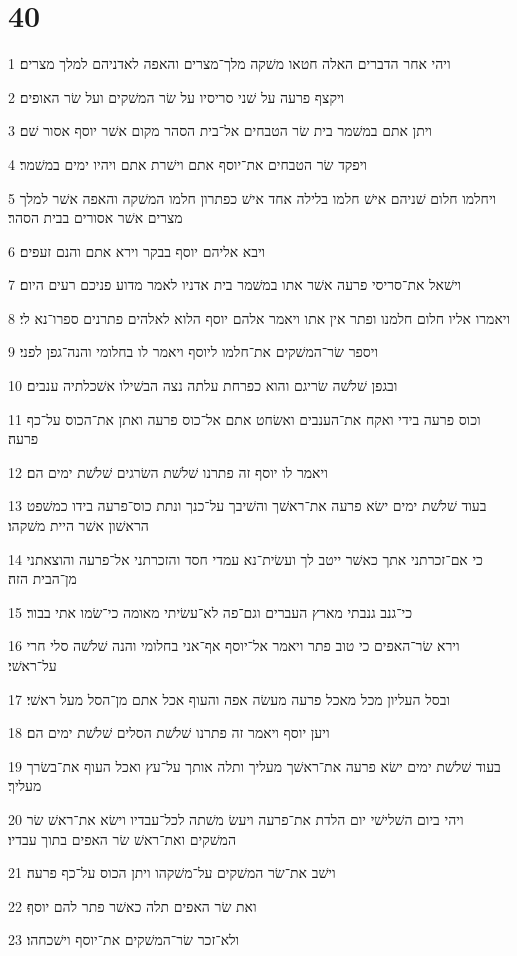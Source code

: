 \chapter{40}

\par 1 ויהי אחר הדברים האלה חטאו משׁקה מלך־מצרים והאפה לאדניהם למלך מצרים׃
\par 2 ויקצף פרעה על שׁני סריסיו על שׂר המשׁקים ועל שׂר האופים׃
\par 3 ויתן אתם במשׁמר בית שׂר הטבחים אל־בית הסהר מקום אשׁר יוסף אסור שׁם׃
\par 4 ויפקד שׂר הטבחים את־יוסף אתם וישׁרת אתם ויהיו ימים במשׁמר׃
\par 5 ויחלמו חלום שׁניהם אישׁ חלמו בלילה אחד אישׁ כפתרון חלמו המשׁקה והאפה אשׁר למלך מצרים אשׁר אסורים בבית הסהר׃
\par 6 ויבא אליהם יוסף בבקר וירא אתם והנם זעפים׃
\par 7 וישׁאל את־סריסי פרעה אשׁר אתו במשׁמר בית אדניו לאמר מדוע פניכם רעים היום׃
\par 8 ויאמרו אליו חלום חלמנו ופתר אין אתו ויאמר אלהם יוסף הלוא לאלהים פתרנים ספרו־נא לי׃
\par 9 ויספר שׂר־המשׁקים את־חלמו ליוסף ויאמר לו בחלומי והנה־גפן לפני׃
\par 10 ובגפן שׁלשׁה שׂריגם והוא כפרחת עלתה נצה הבשׁילו אשׁכלתיה ענבים׃
\par 11 וכוס פרעה בידי ואקח את־הענבים ואשׂחט אתם אל־כוס פרעה ואתן את־הכוס על־כף פרעה׃
\par 12 ויאמר לו יוסף זה פתרנו שׁלשׁת השׂרגים שׁלשׁת ימים הם׃
\par 13 בעוד שׁלשׁת ימים ישׂא פרעה את־ראשׁך והשׁיבך על־כנך ונתת כוס־פרעה בידו כמשׁפט הראשׁון אשׁר היית משׁקהו׃
\par 14 כי אם־זכרתני אתך כאשׁר ייטב לך ועשׂית־נא עמדי חסד והזכרתני אל־פרעה והוצאתני מן־הבית הזה׃
\par 15 כי־גנב גנבתי מארץ העברים וגם־פה לא־עשׂיתי מאומה כי־שׂמו אתי בבור׃
\par 16 וירא שׂר־האפים כי טוב פתר ויאמר אל־יוסף אף־אני בחלומי והנה שׁלשׁה סלי חרי על־ראשׁי׃
\par 17 ובסל העליון מכל מאכל פרעה מעשׂה אפה והעוף אכל אתם מן־הסל מעל ראשׁי׃
\par 18 ויען יוסף ויאמר זה פתרנו שׁלשׁת הסלים שׁלשׁת ימים הם׃
\par 19 בעוד שׁלשׁת ימים ישׂא פרעה את־ראשׁך מעליך ותלה אותך על־עץ ואכל העוף את־בשׂרך מעליך׃
\par 20 ויהי ביום השׁלישׁי יום הלדת את־פרעה ויעשׂ משׁתה לכל־עבדיו וישׂא את־ראשׁ שׂר המשׁקים ואת־ראשׁ שׂר האפים בתוך עבדיו׃
\par 21 וישׁב את־שׂר המשׁקים על־משׁקהו ויתן הכוס על־כף פרעה׃
\par 22 ואת שׂר האפים תלה כאשׁר פתר להם יוסף׃
\par 23 ולא־זכר שׂר־המשׁקים את־יוסף וישׁכחהו׃

